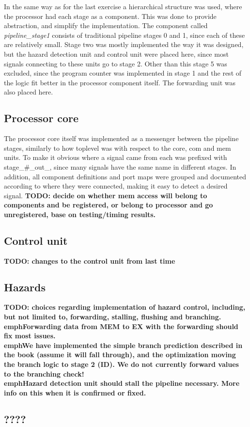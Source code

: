 In the same way as for the last exercise a hierarchical structure was used, where the processor had each stage as a component. This was done to provide abstraction, and simplify the implementation. The component called \emph{pipeline\_stage1} consists of traditional pipeline stages 0 and 1, since each of these are relatively small. Stage two was mostly implemented the way it was designed, but the hazard detection unit and control unit were placed here, since most signals connecting to these units go to stage 2. Other than this stage 5 was excluded, since the program counter was implemented in stage 1 and the rest of the logic fit better in the processor component itself. The forwarding unit was also placed here.
\subsection{Processor core}
The processor core itself was implemented as a messenger between the pipeline stages, similarly to how toplevel was with respect to the core, com and mem units. To make it obvious where a signal came from each was prefixed with stage\_\#\_out\_, since many signals have the same name in different stages. In addition, all component definitions and port maps were grouped and documented according to where they were connected, making it easy to detect a desired signal.
\bf{TODO: decide on whether mem access will belong to components and be registered, or belong to processor and go unregistered, base on testing/timing results.}

\subsection{Control unit}
\bf{TODO: changes to the control unit from last time}
\subsection{Hazards}
\bf{TODO: choices regarding implementation of hazard control, including, but not limited to, forwarding, stalling, flushing and branching.}
emph{Forwarding data from MEM to EX with the forwarding should fix most issues.\\}
emph{We have implemented the simple branch prediction described in the book (assume it will fall through), and the optimization moving the branch logic to stage 2 (ID). We do not currently forward values to the branching check!\\}
emph{Hazard detection unit should stall the pipeline necessary. More info on this when it is confirmed or fixed.\\}

\subsection{????}